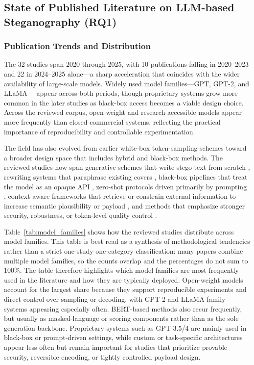 \subsection{State of Published Literature on LLM-based Steganography (RQ1)}
\label{subsec:rq1}

\subsubsection{Publication Trends and Distribution}
The 32 studies span 2020 through 2025, with 10 publications falling in 2020--2023 and 22 in 2024--2025 alone---a sharp acceleration that coincides with the wider availability of large-scale models. Widely used model families---GPT, GPT-2, and LLaMA \cite{brown2020language,radford2019gpt2,xi2025rise}---appear across both periods, though proprietary systems grow more common in the later studies as black-box access becomes a viable design choice. Across the reviewed corpus, open-weight and research-accessible models appear more frequently than closed commercial systems, reflecting the practical importance of reproducibility and controllable experimentation.

The field has also evolved from earlier white-box token-sampling schemes toward a broader design space that includes hybrid and black-box methods. The reviewed studies now span generative schemes that write stego text from scratch \cite{yang2020vae,zhang2021provably,ding2023discop,kaptchuk2021meteor}, rewriting systems that paraphrase existing covers \cite{li2023rewriting,ou2025multigranularity}, black-box pipelines that treat the model as an opaque API \cite{wu2024generative,steinebach2024natural,kuznetsov2025deepstego,wozniak2025multicriteria}, zero-shot protocols driven primarily by prompting \cite{lin2024zero}, context-aware frameworks that retrieve or constrain external information to increase semantic plausibility or payload \cite{liao2024co,wang2023hi,shi2025emotionally}, and methods that emphasize stronger security, robustness, or token-level quality control \cite{kaptchuk2021meteor,ding2023discop,lin2025positionagnostic,chen2025activetwo,wang2025rsstega}.

Table~\ref{tab:model_families} shows how the reviewed studies distribute across model families. This table is best read as a synthesis of methodological tendencies rather than a strict one-study-one-category classification: many papers combine multiple model families, so the counts overlap and the percentages do not sum to 100\%. The table therefore highlights which model families are most frequently used in the literature and how they are typically deployed. Open-weight models account for the largest share because they support reproducible experiments and direct control over sampling or decoding, with GPT-2 and LLaMA-family systems appearing especially often. BERT-based methods also recur frequently, but usually as masked-language or scoring components rather than as the sole generation backbone. Proprietary systems such as GPT-3.5/4 are mainly used in black-box or prompt-driven settings, while custom or task-specific architectures appear less often but remain important for studies that prioritize provable security, reversible encoding, or tightly controlled payload design.

